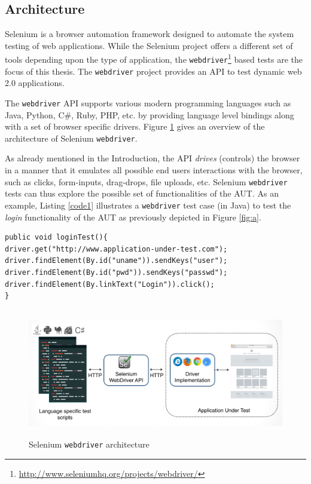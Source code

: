 \subsection{Architecture}
\label{ssec:webdriverArchitecture}
Selenium is a browser automation framework designed to automate the system testing of web applications. While the Selenium project offers a different set of tools depending upon the type of application, the  \texttt{webdriver}\footnote{\url{http://www.seleniumhq.org/projects/webdriver/}} based tests are the focus of this thesis. The \texttt{webdriver} project provides an API to test dynamic web 2.0 applications. 

The \texttt{webdriver} API supports various modern programming languages such as Java, Python, C\#, Ruby, PHP, etc. by providing language level bindings along with a set of browser specific drivers. Figure \ref{fig:webdriverArchitecture} gives an overview of the architecture of Selenium \texttt{webdriver}.

As already mentioned in the Introduction, the API \textit{drives} (controls) the browser in a manner that it emulates all possible end users interactions with the browser, such as clicks, form-inputs, drag-drops, file uploads, etc. Selenium \texttt{webdriver} tests can thus explore the possible set of functionalities of the AUT. As an example, Listing \ref{code1} illustrates a \texttt{webdriver} test case (in Java) to test the \textit{login} functionality of the AUT as previously depicted in Figure \ref{fig:a}.
\begin{center}
\begin{scriptsize}
\centering
\lstset{
  basicstyle=\ttfamily,
  columns=fullflexible,
  keepspaces=true,
}
  
\begin{lstlisting}[caption=\texttt{loginTest},label=code1]
public void loginTest(){
driver.get("http://www.application-under-test.com");
driver.findElement(By.id("uname")).sendKeys("user");
driver.findElement(By.id("pwd")).sendKeys("passwd");
driver.findElement(By.linkText("Login")).click();
}
\end{lstlisting}
\end{scriptsize} 
\end{center}
 
\begin{figure}[h! ]
\makeatletter 
\makeatother
    \centering
  \includegraphics[width=5.5in,height=2.2in]{./Figures/webdriver_Archi}
  \caption{Selenium \texttt{webdriver} architecture}
  \label{fig:webdriverArchitecture} 
\end{figure}

